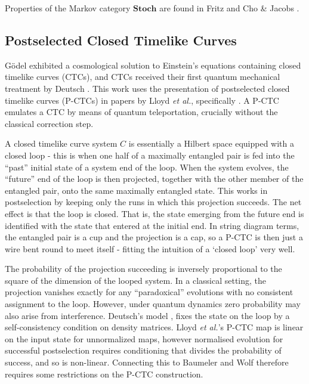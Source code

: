 \documentclass[10pt, a4paper]{article}
\begin{document}
Properties of the Markov category $\mathbf{Stoch}$ are found in Fritz \cite{Fritz2020-dd} and Cho \& Jacobs \cite{ChoJacobs2019}.

\subsection{Postselected Closed Timelike Curves}

G\"{o}del \cite{Gdel1949} exhibited a cosmological solution to Einstein's equations containing closed timelike curves (CTCs), and CTCs received their first quantum mechanical treatment by Deutsch \cite{Deutsch1991}. This work uses the presentation of postselected closed timelike curves (P-CTCs) in papers by Lloyd \emph{et al.}, specifically \cite{Lloyd2011b, Lloyd2011-zc}. A P-CTC emulates a CTC by means of quantum teleportation, crucially without the classical correction step. 

A closed timelike curve system $C$ is essentially a Hilbert space equipped with a closed loop - this is when one half of a maximally entangled pair is fed into the ``past'' initial state of a system end of the loop. When the system evolves, the ``future'' end of the loop is then projected, together with the other member of the entangled pair, onto the same maximally entangled state. This works in postselection by keeping only the runs in which this projection succeeds. The net effect is that the loop is closed. That is, the state emerging from the future end is identified with the state that entered at the initial end. In string diagram terms, the entangled pair is a cup and the projection is a cap, so a P-CTC is then just a wire bent round to meet itself - fitting the intuition of a `closed loop' very well. 

The probability of the projection succeeding is inversely proportional to the square of the dimension of the looped system. In a classical setting, the projection vanishes exactly for any ``paradoxical'' evolutions with no consistent assignment to the loop. However, under quantum dynamics zero probability may also arise from interference. Deutsch's model \cite{Deutsch1991}, fixes the state on the loop by a self-consistency condition on density matrices. Lloyd \emph{et al.}'s P-CTC map is linear on the input state for unnormalized maps, however normalised evolution for successful postselection requires conditioning that divides the probability of success, and so is non-linear. Connecting this to Baumeler and Wolf \cite[§VI]{BaumelerWolf2017} therefore requires some restrictions on the P-CTC construction.
\end{document}
